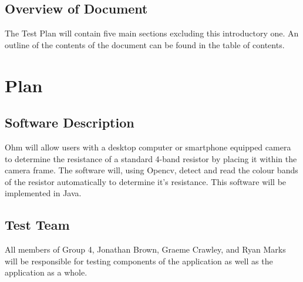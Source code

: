 \documentclass[12pt, titlepage]{article}
\begin{document}

\subsection{Overview of Document}
The Test Plan will contain five main sections excluding this introductory one. An outline of the contents of the document can be found in the table of contents.

\section{Plan}
	
\subsection{Software Description}
Ohm will allow users with a desktop computer or smartphone equipped camera to determine the resistance of a standard 4-band resistor by placing it within the camera frame. The software will, using Opencv, detect and read the colour bands of the resistor automatically to determine it's resistance. This software will be implemented in Java.
\subsection{Test Team}
All members of Group 4, Jonathan Brown, Graeme Crawley, and Ryan Marks will be responsible for testing components of the application as well as the application as a whole.
\end{document}
